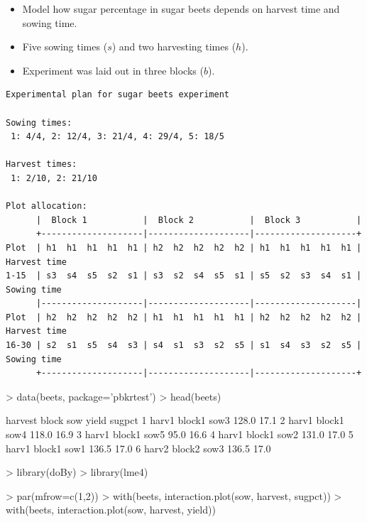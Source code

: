 \begin{sframe}
 \begin{itemize}
 \item Model how sugar percentage in sugar beets depends on
   harvest time and sowing time.
 \item Five sowing times ($s$) and two harvesting times ($h$).
 \item Experiment was laid out in three blocks ($b$).
 \end{itemize}

{\tiny
\begin{verbatim}
Experimental plan for sugar beets experiment

Sowing times:
 1: 4/4, 2: 12/4, 3: 21/4, 4: 29/4, 5: 18/5

Harvest times:
 1: 2/10, 2: 21/10

Plot allocation:
      |  Block 1           |  Block 2           |  Block 3           |
      +--------------------|--------------------|--------------------+
Plot  | h1  h1  h1  h1  h1 | h2  h2  h2  h2  h2 | h1  h1  h1  h1  h1 | Harvest time
1-15  | s3  s4  s5  s2  s1 | s3  s2  s4  s5  s1 | s5  s2  s3  s4  s1 | Sowing time
      |--------------------|--------------------|--------------------|
Plot  | h2  h2  h2  h2  h2 | h1  h1  h1  h1  h1 | h2  h2  h2  h2  h2 | Harvest time
16-30 | s2  s1  s5  s4  s3 | s4  s1  s3  s2  s5 | s1  s4  s3  s2  s5 | Sowing time
      +--------------------|--------------------|--------------------+
\end{verbatim}
}
\end{sframe}

\begin{sframe}
\begin{Schunk}
\begin{Sinput}
> data(beets, package='pbkrtest')
> head(beets)
\end{Sinput}
\begin{Soutput}
  harvest  block  sow yield sugpct
1   harv1 block1 sow3 128.0   17.1
2   harv1 block1 sow4 118.0   16.9
3   harv1 block1 sow5  95.0   16.6
4   harv1 block1 sow2 131.0   17.0
5   harv1 block1 sow1 136.5   17.0
6   harv2 block2 sow3 136.5   17.0
\end{Soutput}
\begin{Sinput}
> library(doBy)
> library(lme4)
\end{Sinput}
\end{Schunk}
\end{sframe}

\begin{sframe}

\begin{Schunk}
\begin{Sinput}
> par(mfrow=c(1,2))
> with(beets, interaction.plot(sow, harvest, sugpct))
> with(beets, interaction.plot(sow, harvest, yield))
\end{Sinput}
\end{Schunk}
\end{sframe}


